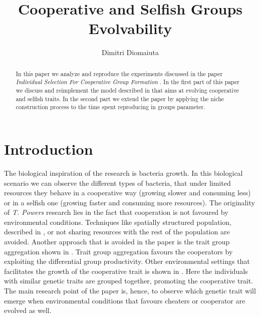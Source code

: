 \documentclass[runningheads]{llncs}
\begin{document}
%
\title{Cooperative and Selfish Groups Evolvability}
%
%
\author{Dimitri Diomaiuta}
%
%
%
\maketitle              %
%
\begin{abstract}
In this paper we analyze and reproduce the experiments discussed in
the paper \textit{Individual
Selection For Cooperative Group Formation} \cite{groups}. In the first
part of this paper we discuss and reimplement the model described in
\cite{groups} that aims at evolving cooperative and selfish traits. In
the second part we extend the paper by applying the niche construction
process to the time spent reproducing in groups parameter.
\end{abstract}
%
%
%

\section{Introduction}
The biological inspiration of the research is bacteria growth. In this
biological scenario we can observe the different types of bacteria,
that under limited resources they behave in a cooperative way (growing
slower and consuming less) or in a selfish one (growing faster and
consuming more resources).
The originality of \textit{T. Powers} research \cite{groups} lies in
the fact that cooperation is not favoured by environmental
conditions. Techniques like spatially structured population, described
in \cite{b1,b2,b3,b5}, or not sharing resources with the rest of the
population are avoided. Another approach that is avoided in the
paper is the trait group aggregation shown in \cite{b6,b7,b8}. Trait
group aggregation favours the cooperators by exploiting the
differential group productivity. Other environmental settings that
facilitates the growth of the cooperative trait is shown in
\cite{b7,b8,b9}. Here the individuals with similar genetic traits are
grouped together, promoting the cooperative trait. The main research
point of the paper is, hence, to observe which genetic trait will
emerge when environmental conditions that favours cheaters or
cooperator are evolved as well. 
\end{document}
